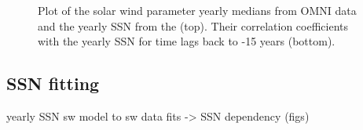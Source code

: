 \begin{figure}
	\caption{Plot of the solar wind parameter yearly medians from OMNI data and the yearly SSN from the \citet{sidc} (top). Their correlation coefficients with the yearly SSN for time lags back to -15 years (bottom).}
	\label{fig:OMNI_yearly_ssn_correlation_b_plot}
\end{figure}

\subsection{SSN fitting}
\label{sec:ssn_fitting}
yearly SSN sw model to sw data fits -> SSN dependency (figs)\\

